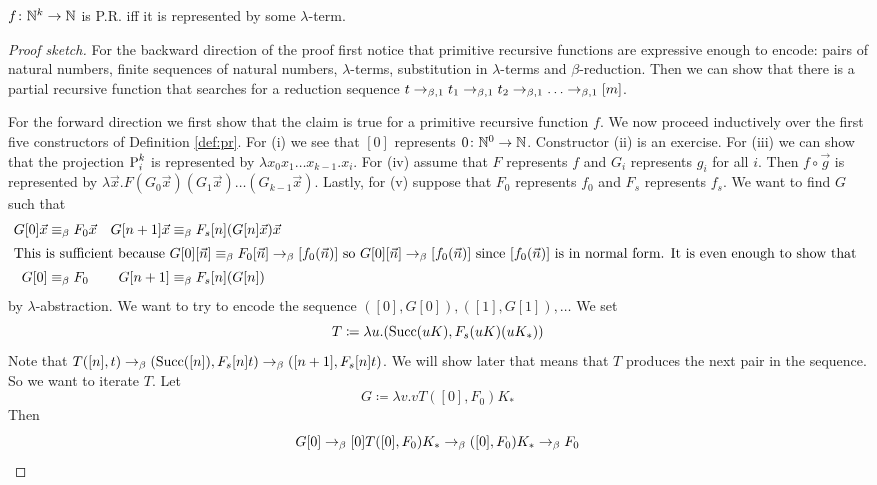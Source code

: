 \begin{boxthm}
    $f \colon \mathbb{N}^k \to \mathbb{N}$ is P.R. iff it is represented by some $\lambda$-term.
\end{boxthm}
\begin{proof}[Proof sketch]
    For the backward direction of the proof first notice that primitive recursive functions are expressive enough to encode: pairs of natural numbers, finite sequences of natural numbers, $\lambda$-terms, substitution in $\lambda$-terms and $\beta$-reduction.
Then we can show that there is a partial recursive function that searches for a reduction sequence $t \beored t_1 \beored t_2 \beored \dots \beored [m]$.

For the forward direction we first show that the claim is true for a primitive recursive function $f$.
We now proceed inductively over the first five constructors of Definition \ref{def:pr}.
For (i) we see that $[0]$ represents $0 \colon \mathbb{N}^0 \to \mathbb{N}$.
Constructor (ii) is an exercise.
For (iii) we can show that the projection $\text{P}_{i}^{k}$ is represented by $\lambda x_0 x_1 \dots x_{k-1}. x_i$.
For (iv) assume that $F$ represents $f$ and $G_i$ represents $g_i$ for all $i$.
Then $f \circ \vec{g}$ is represented by $\lambda \vec{x}. F (G_0 \vec{x}) (G_1 \vec{x}) \dots (G_{k-1} \vec{x})$.
Lastly, for (v) suppose that $F_0$ represents $f_0$ and $F_s$ represents $f_s$.
We want to find $G$ such that
\begin{align*}
    G[0]\vec{x} &\equiv_{\beta} F_0 \vec{x} & G[n + 1]\vec{x} &\equiv_{\beta} F_s [n] (G[n] \vec{x})\vec{x} \\
    \intertext{This is sufficient because $G[0][\vec{n}] \equiv_{\beta} F_0[\vec{n}] \to_{\beta} [f_0(\vec{n})]$ so $G[0][\vec{n}] \to_{\beta} [f_0(\vec{n})]$ since $[f_0(\vec{n})]$ is in normal form. It is even enough to show that }
    G[0] &\equiv_{\beta} F_0 & G[n + 1] &\equiv_{\beta} F_s[n](G[n])
\end{align*}
by $\lambda$-abstraction.
We want to try to encode the sequence $([0], G[0]), ([1], G[1]), \dots$
We set
\begin{equation*}
T \coloneq \lambda u. (\text{Succ}(uK), F_s(uK)(uK_*))
\end{equation*}
Note that $T([n], t) \to_{\beta} (\text{Succ}([n]), F_s[n]t) \to_{\beta} ([n + 1], F_s[n]t)$.
We will show later that means that $T$ produces the next pair in the sequence.
So we want to iterate $T$.
Let
\begin{equation*}
    G \coloneq \lambda v.vT([0], F_0)K_*
\end{equation*}
Then
\begin{equation*}
    G[0] \to_{\beta} [0]T([0], F_0)K_* \to_{\beta} ([0], F_0) K_* \to_{\beta} F_0
\end{equation*}


\end{proof}
